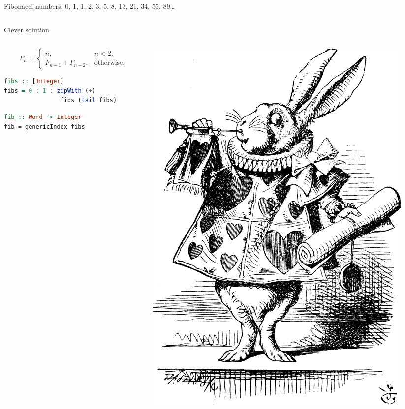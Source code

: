 \documentclass[handout]{beamer}
\def\fiboEq{
$$
F_n = \begin{cases}
n, & n < 2, \\
F_{n-1} + F_{n-2}, & \text{otherwise}.
\end{cases}
$$
}
\begin{document}
\begin{frame}[fragile]{Fibonacci numbers: 0, 1, 1, 2, 3, 5, 8, 13, 21, 34, 55, 89\dots}
\begin{columns}[T]
\end{columns}

\end{frame}

\begin{frame}[fragile]{Clever solution}

\begin{columns}[T]
  \begin{column}{.58\textwidth}

\fiboEq

\begin{lstlisting}[language=Haskell]
fibs :: [Integer]
fibs = 0 : 1 : zipWith (+)
                fibs (tail fibs)
\end{lstlisting}

\begin{lstlisting}[language=Haskell]
fib :: Word -> Integer
fib = genericIndex fibs
\end{lstlisting}

\end{column}

\begin{column}{.42\textwidth}
  \includegraphics[width=\textwidth]{happy-rabbit.png}
\end{column}

\end{columns}

\end{frame}
\end{document}
